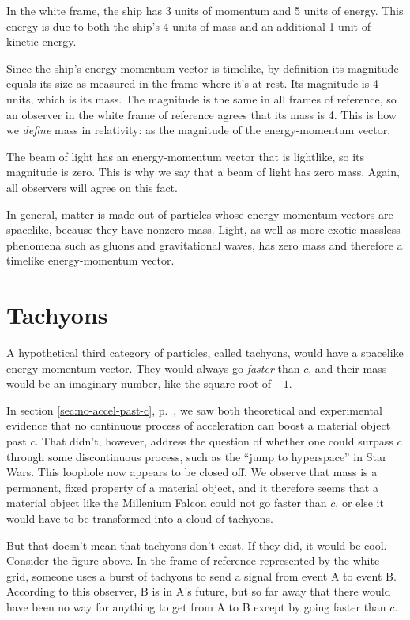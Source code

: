 In the white frame, the ship has 3 units of momentum and 5 units
of energy. This energy is due to both the ship's 4 units of mass and an additional 1 unit of kinetic energy.

Since the ship's energy-momentum vector is timelike, by definition its magnitude equals its size as measured
in the frame where it's at rest. Its magnitude is 4 units, which is its mass. The magnitude is the same in
all frames of reference, so an observer in the white frame of reference agrees that its mass is 4. This is
how we \emph{define} mass in relativity: as the magnitude of the energy-momentum vector.

The beam of light has an energy-momentum vector that is lightlike, so its magnitude is zero. This is why we
say that a beam of light has zero mass. Again, all observers will agree on this fact.

In general, matter is made out of particles whose energy-momentum vectors are spacelike, because they have nonzero
mass. Light, as well as more exotic massless phenomena such as gluons and gravitational waves, has zero mass
and therefore a timelike energy-momentum vector.

\section{Tachyons}

A hypothetical third category of particles, called tachyons, would have a spacelike energy-momentum vector.
They would always go \emph{faster} than $c$, and their mass would be an imaginary number, like the square root of $-1$.

In section \ref{sec:no-accel-past-c}, p.~\pageref{sec:no-accel-past-c}, we saw both theoretical and experimental
evidence that no continuous process of acceleration can boost a material object past $c$. That didn't, however,
address the question of whether one could surpass $c$ through some discontinuous process, such as the
``jump to hyperspace'' in Star Wars. This loophole now appears to be closed off. We observe that mass is a permanent,
fixed property of a material object, and it therefore seems that a material object like the Millenium Falcon
could not go faster than $c$, or else it would have to be transformed into a cloud of tachyons.


But that doesn't mean that tachyons don't exist. If they did, it would be cool. Consider the figure above.
In the frame of reference represented by the white grid, someone uses a burst of tachyons to send a signal from event A
to event B. According to this observer, B is in A's future, but so far away that there would have been no way 
for anything to get
from A to B except by going faster than $c$.

